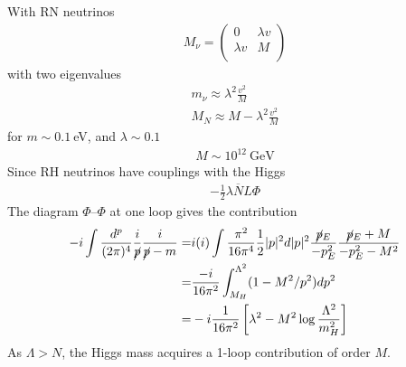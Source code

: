 \documentclass[12pt,letterpaper]{article}
\begin{document}
With RN neutrinos
\begin{align*}
  M_{\nu}=
  \begin{pmatrix}
    0 & \lambda v\\    
    \lambda v &M \\    
  \end{pmatrix}
\end{align*}
with two eigenvalues
\begin{align*}
  m_{\nu}\approx \lambda^2\frac{v^2}{M}\nonumber\\
 M_N\approx M-\lambda^2\frac{v^2}{M}
\end{align*}
for $m\sim 0.1\ $eV, and $\lambda\sim 0.1$
\begin{align*}
  M\sim 10^{12}\ \text{GeV}
\end{align*}
Since RH neutrinos have couplings with the Higgs
\begin{align*}
  -\frac{1}{2}\lambda \overline{N}L\Phi
\end{align*}
The diagram $\Phi$--$\Phi$ at one loop gives the contribution
\begin{align*}
  -i\int
  \frac{d^p}{(2\pi)^4}\frac{i}{\cancel{p}}\frac{i}{\cancel{p}-m}
=&i(i)\int
\frac{\pi^2}{16\pi^4}\frac{1}{2}|p|^2d|p|^2\frac{\cancel{p}_E}{-p_E^2}
\frac{\cancel{p}_E+M}{-p_E^2-M^2}\nonumber\\
=&\frac{-i}{16\pi^2}\int_{M_H}^{\Lambda^{2}}(1-M^2/p^2)dp^{2}\nonumber\\
=&-i \frac{1}{16\pi^2}\left[ \lambda^2-M^2\log \frac{\Lambda^2}{m_H^2} \right]
\end{align*}
As $\Lambda>N$, the Higgs mass acquires a 1-loop contribution of order $M$. 


\end{document}
